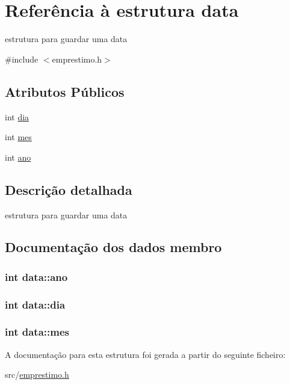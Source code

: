 \hypertarget{structdata}{}\section{Referência à estrutura data}
\label{structdata}


estrutura para guardar uma data  




{\ttfamily \#include $<$emprestimo.\+h$>$}

\subsection*{Atributos Públicos}
\begin{DoxyCompactItemize}
\item 
int \hyperlink{structdata_ac514ae966b758141957f8254bdd7850b}{dia}
\item 
int \hyperlink{structdata_ad0f682acbc0199c05dc584f887f580a1}{mes}
\item 
int \hyperlink{structdata_a2898507d44bff1cd51afb7dd562d2378}{ano}
\end{DoxyCompactItemize}


\subsection{Descrição detalhada}
estrutura para guardar uma data 

\subsection{Documentação dos dados membro}
\subsubsection[{\texorpdfstring{ano}{ano}}]{\setlength{\rightskip}{0pt plus 5cm}int data\+::ano}\hypertarget{structdata_a2898507d44bff1cd51afb7dd562d2378}{}\label{structdata_a2898507d44bff1cd51afb7dd562d2378}
\subsubsection[{\texorpdfstring{dia}{dia}}]{\setlength{\rightskip}{0pt plus 5cm}int data\+::dia}\hypertarget{structdata_ac514ae966b758141957f8254bdd7850b}{}\label{structdata_ac514ae966b758141957f8254bdd7850b}
\subsubsection[{\texorpdfstring{mes}{mes}}]{\setlength{\rightskip}{0pt plus 5cm}int data\+::mes}\hypertarget{structdata_ad0f682acbc0199c05dc584f887f580a1}{}\label{structdata_ad0f682acbc0199c05dc584f887f580a1}


A documentação para esta estrutura foi gerada a partir do seguinte ficheiro\+:\begin{DoxyCompactItemize}
\item 
src/\hyperlink{emprestimo_8h}{emprestimo.\+h}\end{DoxyCompactItemize}
